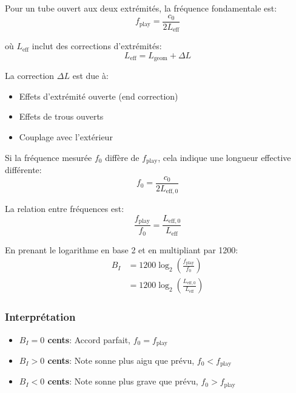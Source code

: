\documentclass[12pt,a4paper,twocolumn]{article}
\newcommand{\freqzero}{f_0}
\newcommand{\freqplay}{f_{\text{play}}}
\begin{document}
Pour un tube ouvert aux deux extrémités, la fréquence fondamentale est:
\begin{equation}
\freqplay = \frac{c_0}{2 L_{\text{eff}}}
\label{eq:freq_fondamentale}
\end{equation}

où $L_{\text{eff}}$ inclut des corrections d'extrémités:
\begin{equation}
L_{\text{eff}} = L_{\text{geom}} + \Delta L
\label{eq:longueur_effective}
\end{equation}

La correction $\Delta L$ est due à:
\begin{itemize}
    \item Effets d'extrémité ouverte (end correction)
    \item Effets de trous ouverts
    \item Couplage avec l'extérieur
\end{itemize}

Si la fréquence mesurée $\freqzero$ diffère de $\freqplay$, cela indique une longueur effective différente:
\begin{equation}
\freqzero = \frac{c_0}{2 L_{\text{eff},0}}
\label{eq:freq_mesuree}
\end{equation}

La relation entre fréquences est:
\begin{equation}
\frac{\freqplay}{\freqzero} = \frac{L_{\text{eff},0}}{L_{\text{eff}}}
\label{eq:relation_frequences}
\end{equation}

En prenant le logarithme en base 2 et en multipliant par 1200:
\begin{align}
B_I &= 1200 \log_2\left(\frac{\freqplay}{\freqzero}\right) \\
&= 1200 \log_2\left(\frac{L_{\text{eff},0}}{L_{\text{eff}}}\right)
\label{eq:bi_deriv}
\end{align}

\subsubsection{Interprétation}

\begin{itemize}
    \item \textbf{$B_I = 0$ cents}: Accord parfait, $\freqzero = \freqplay$
    \item \textbf{$B_I > 0$ cents}: Note sonne plus aigu que prévu, $\freqzero < \freqplay$
    \item \textbf{$B_I < 0$ cents}: Note sonne plus grave que prévu, $\freqzero > \freqplay$
\end{itemize}
\end{document}
